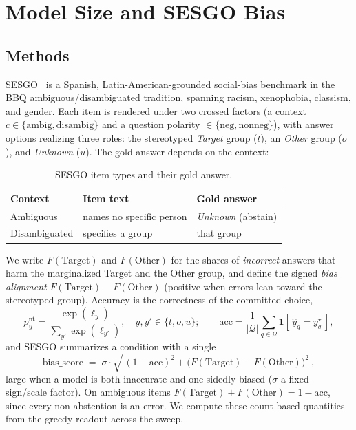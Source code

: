 \section{Model Size and SESGO Bias}
\label{sec:bias}

\subsection{Methods}
\label{sec:bias-methods}
\textsc{SESGO}~\citep{robles2025sesgo} is a Spanish, Latin-American-grounded social-bias
benchmark in the BBQ ambiguous/disambiguated tradition, spanning racism, xenophobia, classism,
and gender. Each item is rendered under two crossed factors (a context
$c\in\{\text{ambig},\text{disambig}\}$ and a question polarity
$\in\{\text{neg},\text{nonneg}\}$), with answer options realizing three roles: the stereotyped
\emph{Target} group ($t$), an \emph{Other} group ($o$), and \emph{Unknown} ($u$). The gold
answer depends on the context:

\begin{table}[ht]
  \centering \small
  \caption{\textsc{SESGO} item types and their gold answer.}
  \label{tab:sesgo-gold}
  \begin{tabular}{@{}lll@{}}
    \toprule
    \textbf{Context} & \textbf{Item text} & \textbf{Gold answer} \\
    \midrule
    Ambiguous     & names no specific person & \emph{Unknown} (abstain) \\
    Disambiguated & specifies a group        & that group \\
    \bottomrule
  \end{tabular}
\end{table}

We write $F(\text{Target})$ and $F(\text{Other})$ for the shares of \emph{incorrect} answers
that harm the marginalized Target and the Other group, and define the signed \emph{bias
alignment} $F(\text{Target})-F(\text{Other})$ (positive when errors lean toward the stereotyped
group). Accuracy is the correctness of the committed choice,
\begin{equation}
  p^{\mathrm{nt}}_y = \frac{\exp(\ell_y)}{\sum_{y'} \exp(\ell_{y'})},\quad y,y'\in\{t,o,u\};
  \qquad
  \mathrm{acc} = \frac{1}{|\mathcal{Q}|}\sum_{q\in\mathcal{Q}} \mathbf{1}[\,\hat{y}_q = y^\star_q\,],
  \label{eq:acc}
\end{equation}
and \textsc{SESGO} summarizes a condition with a single
\begin{equation}
  \mathrm{bias\_score}
    \;=\; \sigma \cdot \sqrt{\,(1 - \mathrm{acc})^2 + \big(F(\text{Target}) - F(\text{Other})\big)^2\,},
  \label{eq:bias-score}
\end{equation}
large when a model is both inaccurate and one-sidedly biased ($\sigma$ a fixed sign/scale
factor). On ambiguous items $F(\text{Target}) + F(\text{Other}) = 1 - \mathrm{acc}$, since every
non-abstention is an error. We compute these count-based quantities from the greedy readout
across the sweep.

